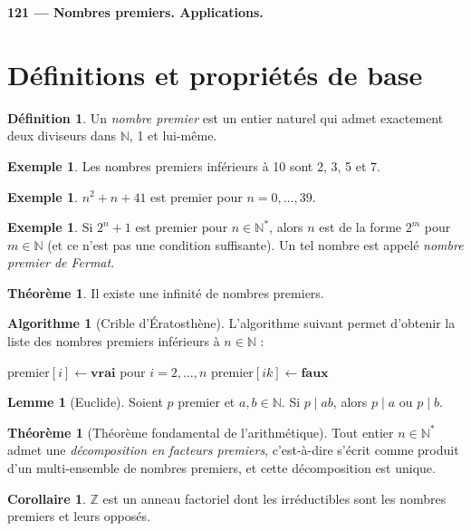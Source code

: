 \documentclass[a5paper, 10pt]{article}
\theoremstyle{definition}
\newtheorem{definition}[equation]{Définition}
\newtheorem{example}[equation]{Exemple}
\newtheorem{theorem}[equation]{Théorème}
\newtheorem{algo}[equation]{Algorithme}
\newtheorem{lemma}[equation]{Lemme}
\newtheorem{corollary}[equation]{Corollaire}
\newcounter{n}
\newcommand\lesson[1]{{\noindent \LARGE \bfseries #1}\\[1pt]}
\def\Z{\mathbb{Z}}
\def\N{\mathbb{N}}
\begin{document}
\author{\textsc{Nguyễn} Lê Thành Dũng}

\lesson{121 --- Nombres premiers. Applications.}

\section{Définitions et propriétés de base}

\begin{definition}
  Un \emph{nombre premier} est un entier naturel qui admet exactement
  deux diviseurs dans $\N$, 1 et lui-même.
\end{definition}
\begin{example}
  Les nombres premiers inférieurs à 10 sont 2, 3, 5 et 7.
\end{example}
\begin{example}
  $n^2 + n + 41$ est premier pour $n = 0, \ldots, 39$.
\end{example}
\begin{example}
  Si $2^n+1$ est premier pour $n \in \N^*$, alors $n$ est de la forme
  $2^m$ pour $m \in \N$ (et ce n'est pas une condition suffisante). Un
  tel nombre est appelé \emph{nombre premier de Fermat}.
\end{example}

\begin{theorem}
  Il existe une infinité de nombres premiers.
\end{theorem}
\begin{algo}[Crible d'Ératosthène]
  L'algorithme suivant permet d'obtenir la liste des nombres premiers
  inférieurs à $n \in \N$ :
\begin{algorithmic}
\State $\mathrm{premier}[i] \gets \mathbf{vrai}$ pour $i = 2, \ldots, n$
\State $\mathrm{premier}[ik] \gets \mathbf{faux}$
\EndFor
\EndIf
\EndFor
\end{algorithmic}
\end{algo}

\begin{lemma}[Euclide]
  Soient $p$ premier et $a, b \in \N$. Si $p \mid ab$, alors
  $p \mid a$ ou $p \mid b$.
\end{lemma}
\begin{theorem}[Théorème fondamental de l'arithmétique]
  Tout entier $n \in \N^*$ admet une \emph{décomposition en facteurs
    premiers}, c'est-à-dire s'écrit comme produit d'un multi-ensemble
  de nombres premiers, et cette décomposition est unique.
\end{theorem}
\begin{corollary}
  $\Z$ est un anneau factoriel dont les irréductibles sont les nombres
  premiers et leurs opposés.
\end{corollary}
\end{document}
